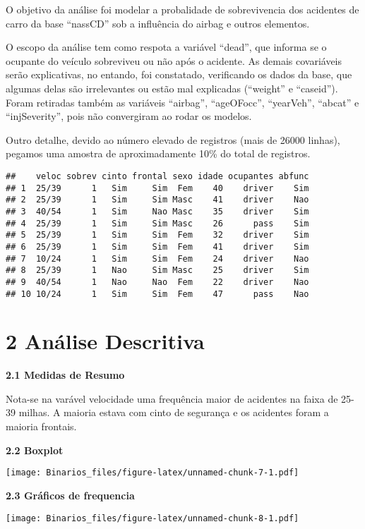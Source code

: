 \documentclass[]{article}
\begin{document}
O objetivo da análise foi modelar a probalidade de sobrevivencia dos
acidentes de carro da base ``nassCD'' sob a influência do airbag e
outros elementos.

O escopo da análise tem como respota a variável ``dead'', que informa se
o ocupante do veículo sobreviveu ou não após o acidente. As demais
covariáveis serão explicativas, no entando, foi constatado, verificando
os dados da base, que algumas delas são irrelevantes ou estão mal
explicadas (``weight'' e ``caseid''). Foram retiradas também as
variáveis ``airbag'', ``ageOFocc'', ``yearVeh'', ``abcat'' e
``injSeverity'', pois não convergiram ao rodar os modelos.

Outro detalhe, devido ao número elevado de registros (mais de 26000
linhas), pegamos uma amostra de aproximadamente 10\% do total de
registros.

\begin{verbatim}
##    veloc sobrev cinto frontal sexo idade ocupantes abfunc
## 1  25/39      1   Sim     Sim  Fem    40    driver    Sim
## 2  25/39      1   Sim     Sim Masc    41    driver    Nao
## 3  40/54      1   Sim     Nao Masc    35    driver    Sim
## 4  25/39      1   Sim     Sim Masc    26      pass    Sim
## 5  25/39      1   Sim     Sim  Fem    32    driver    Sim
## 6  25/39      1   Sim     Sim  Fem    41    driver    Sim
## 7  10/24      1   Sim     Sim  Fem    24    driver    Nao
## 8  25/39      1   Nao     Sim Masc    25    driver    Sim
## 9  40/54      1   Nao     Nao  Fem    22    driver    Nao
## 10 10/24      1   Sim     Sim  Fem    47      pass    Nao
\end{verbatim}

\hypertarget{analise-descritiva}{%
\section{2 Análise Descritiva}\label{analise-descritiva}}

\textbf{2.1 Medidas de Resumo}

Nota-se na varável velocidade uma frequência maior de acidentes na faixa
de 25-39 milhas. A maioria estava com cinto de segurança e os acidentes
foram a maioria frontais.

\textbf{2.2 Boxplot}

\texttt{[image: Binarios\_files/figure-latex/unnamed-chunk-7-1.pdf]}

\textbf{2.3 Gráficos de frequencia}

\texttt{[image: Binarios\_files/figure-latex/unnamed-chunk-8-1.pdf]}
\end{document}
